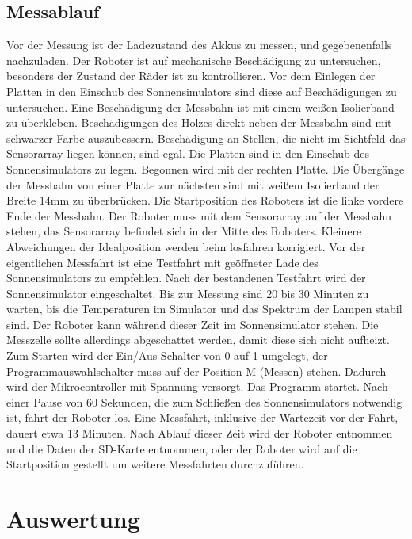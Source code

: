 \documentclass[a4paper,bibtotoc,oneside]{scrbook}
\begin{document}
\subsection{Messablauf}\thispagestyle{empty}
Vor der Messung ist der Ladezustand des Akkus zu messen, und gegebenenfalls nachzuladen. Der Roboter ist auf mechanische Beschädigung zu untersuchen, besonders der Zustand der Räder ist zu kontrollieren.
Vor dem Einlegen der Platten in den Einschub des Sonnensimulators sind diese auf Beschädigungen zu untersuchen. Eine Beschädigung der Messbahn ist mit einem weißen Isolierband zu überkleben. Beschädigungen des Holzes direkt neben der Messbahn sind mit schwarzer Farbe auszubessern. Beschädigung an Stellen, die nicht im Sichtfeld das Sensorarray liegen können, sind egal.
Die Platten sind in den Einschub des Sonnensimulators zu legen. Begonnen wird mit der rechten Platte. Die Übergänge der Messbahn von einer Platte zur nächsten sind mit weißem Isolierband  der Breite 14mm zu überbrücken. 
Die Startposition des Roboters ist die linke vordere Ende der Messbahn. Der Roboter muss mit dem Sensorarray auf der Messbahn stehen, das Sensorarray befindet sich in der Mitte des Roboters. Kleinere Abweichungen der Idealposition werden beim losfahren korrigiert. 
Vor der eigentlichen Messfahrt ist eine Testfahrt mit geöffneter Lade des Sonnensimulators zu empfehlen. 
Nach der bestandenen Testfahrt wird der Sonnensimulator eingeschaltet. Bis zur Messung sind 20 bis 30 Minuten zu warten, bis die Temperaturen im Simulator und das Spektrum der Lampen stabil sind. Der Roboter kann während dieser Zeit im Sonnensimulator stehen. Die Messzelle sollte allerdings abgeschattet werden, damit diese sich nicht aufheizt. 
Zum Starten wird der Ein/Aus-Schalter von 0 auf 1 umgelegt, der Programmauswahlschalter muss auf der Position M (Messen) stehen. Dadurch wird der Mikrocontroller mit Spannung versorgt. Das Programm startet. Nach einer Pause von 60 Sekunden, die zum Schließen des Sonnensimulators notwendig ist, fährt der Roboter los. Eine Messfahrt, inklusive der Wartezeit vor der Fahrt, dauert etwa 13 Minuten. Nach Ablauf dieser Zeit wird der Roboter entnommen und die Daten der SD-Karte entnommen, oder der Roboter wird auf die Startposition gestellt um weitere Messfahrten durchzuführen.


\section{Auswertung}\thispagestyle{empty}
\end{document}
